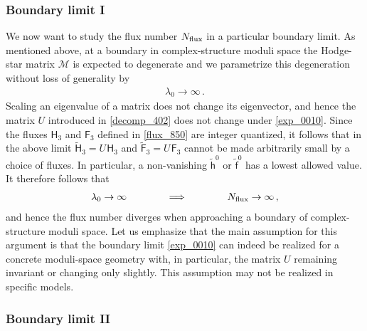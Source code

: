 \documentclass[12pt,a4paper]{article}
\newcommand{\eq}[1]{\begin{equation}
                     \begin{split} #1 \end{split}
                     \end{equation}}
\newcommand{\op}{\hspace{1pt}}
\numberwithin{equation}{section}
\begin{document}

\subsubsection*{Boundary limit I}


We now want to study the flux number $N_{\rm flux}$ in a particular boundary limit. 
As mentioned 
above, at a boundary in complex-structure moduli space the Hodge-star matrix 
$\mathcal M$ is expected to degenerate and  we parametrize this degeneration without 
loss of generality by 
\eq{
  \label{exp_0010}
  \lambda_0 \to \infty\,.
}
Scaling an eigenvalue of a matrix does not change its eigenvector, and hence
the matrix $U$ introduced in 
\eqref{decomp_402} does not change under \eqref{exp_0010}.
Since the fluxes $\mathsf H_3$ and $\mathsf F_3$ defined in \eqref{flux_850}
are integer quantized, it follows that in the above limit \label{exp_001}
$\widetilde{\mathsf H}_3 = U\op \mathsf H_3$ and 
$\widetilde{\mathsf F}_3 = U\op \mathsf F_3$ 
cannot be made arbitrarily small by a choice of fluxes.
In particular, a non-vanishing $\tilde{\mathsf h}^0$ or $\tilde{\mathsf f}^0$
has a lowest allowed value. 
It therefore follows that 
\eq{
    \lambda_0 \to \infty \hspace{40pt}\Longrightarrow \hspace{40pt}
    N_{\rm flux} \to  \infty\,,
}
and hence the flux number diverges when approaching a boundary of 
complex-structure moduli space. 
Let us emphasize that  the main assumption for this argument is that the 
boundary limit \eqref{exp_0010} 
can indeed be realized for a concrete moduli-space geometry with, in particular, the 
matrix $U$ remaining invariant or changing only slightly. This assumption may not be realized
in specific models. 





\subsubsection*{Boundary limit II}
\end{document}

